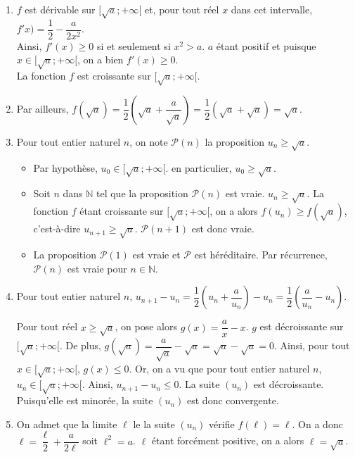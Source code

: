 \documentclass[11pt,fleqn, openany]{book} %
\begin{document}
\begin{solution}\hspace{0pt}
\begin{enumerate}\item $f$ est dérivable sur $[ \sqrt{a};+\infty[$ et, pour tout réel $x$ dans cet intervalle, $f'x)=\dfrac{1}{2}-\dfrac{a}{2x^2}$. \\Ainsi, $f'(x)\geqslant 0$ si et seulement si $x^2 > a$. $a$ étant positif et puisque $x\in [ \sqrt{a};+\infty[$, on a bien $f'(x) \geqslant 0$.\\ La fonction $f$ est croissante sur $[ \sqrt{a};+\infty[$.

\item Par ailleurs, $f(\sqrt{a})=\dfrac{1}{2}\left( \sqrt{a}+ \dfrac{a}{\sqrt{a}}\right)=\dfrac{1}{2}(\sqrt{a}+\sqrt{a})=\sqrt{a}$.

\item Pour tout entier naturel $n$, on note $\mathcal{P}(n)$ la proposition $u_n\geqslant \sqrt{a}$.
\begin{itemize}
\item Par hypothèse, $u_0 \in [ \sqrt{a};+\infty[$. en particulier, $u_0 \geqslant \sqrt{a}$.
\item Soit $n$ dans $\mathbb{N}$ tel que la proposition $\mathcal{P}(n)$ est vraie. $u_n \geqslant \sqrt{a}$. La fonction $f$ étant croissante sur $[ \sqrt{a};+\infty[$, on a alors $f(u_n) \geqslant f(\sqrt{a})$, c'est-à-dire $u_{n+1}\geqslant \sqrt{a}$. $\mathcal{P}(n+1)$ est donc vraie.
\item La proposition $\mathcal{P}(1)$ est vraie et $\mathcal{P}$ est héréditaire. Par récurrence, $\mathcal{P}(n)$ est vraie pour $n\in\mathbb{N}$.
\end{itemize}
\item Pour tout entier naturel $n$, $u_{n+1}-u_n=\dfrac{1}{2}\left(u_n+\dfrac{a}{u_n}\right)-u_n=\dfrac{1}{2}\left(\dfrac{a}{u_n}-u_n\right)$. 

Pour tout réel $x\geqslant \sqrt{a}$, on pose alors $g(x)=\dfrac{a}{x}-x$. $g$ est décroissante sur $[ \sqrt{a};+\infty[$. De plus, $g(\sqrt{a})=\dfrac{a}{\sqrt{a}}-\sqrt{a}=\sqrt{a}-\sqrt{a}=0$. Ainsi, pour tout $x\in [ \sqrt{a};+\infty[$, $g(x)\leqslant 0$. Or, on a vu que pour tout entier naturel $n$, $u_n \in [ \sqrt{a};+\infty[$. Ainsi, $u_{n+1}-u_n \leqslant 0$. La suite $(u_n)$ est décroissante. Puisqu'elle est minorée, la suite $(u_n)$ est donc convergente. 

\item On admet que la limite $\ell$ le la suite $(u_n)$ vérifie $f(\ell)=\ell$. On a donc $\ell=\dfrac{\ell}{2}+\dfrac{a}{2\ell}$ soit $\ell^2=a$. $\ell$ étant forcément positive, on a alors $\ell=\sqrt{a}$.\end{enumerate}\end{solution}
\end{document}
